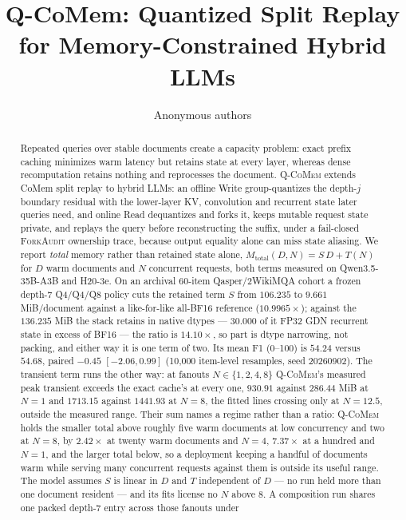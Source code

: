 \documentclass{article}
\title{Q-CoMem: Quantized Split Replay for Memory-Constrained Hybrid LLMs}
\author{Anonymous authors}
\newcommand{\qcomem}{\textsc{Q-CoMem}}
\newcommand{\method}{\textsc{ForkAudit}}
\begin{document}
\raggedbottom
\maketitle

\begin{abstract}
Repeated queries over stable documents create a capacity problem: exact prefix
caching minimizes warm latency but retains state at every layer, whereas dense
recomputation retains nothing and reprocesses the document.  \qcomem{} extends
CoMem split replay to hybrid LLMs: an offline Write group-quantizes the depth-$j$
boundary residual with the lower-layer KV, convolution and recurrent state later
queries need, and online Read dequantizes and forks it, keeps mutable request
state private, and replays the query before reconstructing the suffix, under a
fail-closed \method{} ownership trace, because output equality alone can miss
state aliasing.
We report \emph{total} memory rather than retained state alone,
$M_{\mathrm{total}}(D,N)=S\,D+T(N)$ for $D$ warm documents and $N$ concurrent
requests, both terms measured on Qwen3.5-35B-A3B and H20-3e.  On an archival
60-item Qasper/2WikiMQA cohort a frozen depth-$7$ Q4/Q4/Q8 policy cuts the
retained term $S$ from $106.235$ to $9.661$ MiB/document against a like-for-like
all-BF16 reference ($10.9965\times$); against the $136.235$ MiB the stack retains
in native dtypes --- $30.000$ of it FP32 GDN recurrent state in excess of BF16 ---
the ratio is $14.10\times$, so part is dtype narrowing, not packing, and either
way it is one term of two.  Its mean F1 (0--100) is $54.24$ versus
$54.68$, paired $-0.45$ $[-2.06,0.99]$ (10,000 item-level resamples, seed
20260902).  The transient term runs the other way: at fanouts $N\in\{1,2,4,8\}$
\qcomem{}'s measured peak transient exceeds the exact cache's at every one,
$930.91$ against $286.44$ MiB at $N=1$ and $1713.15$ against $1441.93$ at $N=8$,
the fitted lines crossing only at $N=12.5$, outside the measured range.
Their sum names a regime rather than a ratio: \qcomem{} holds the smaller total
above roughly five warm documents at low concurrency and two at $N=8$, by
$2.42\times$ at twenty warm documents and $N=4$, $7.37\times$ at a hundred and
$N=1$, and the larger total below, so a deployment keeping a handful of documents warm while
serving many concurrent requests against them is outside its useful range.  The
model assumes $S$ is linear in $D$ and $T$ independent of $D$ --- no run held
more than one document resident --- and its fits license no $N$ above $8$.
A composition run shares one packed depth-$7$ entry across those fanouts under

\end{abstract}
\end{document}
